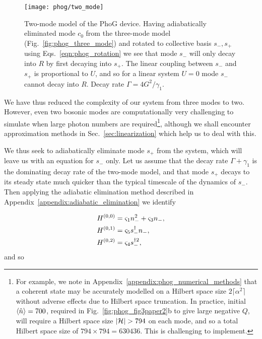 \begin{figure}[htp]
\captionsetup{width=0.8\linewidth}
\centering
\texttt{[image: phog/two\_mode]}
\caption{\label{fig:phog_two_mode_model} Two-mode model of the PhoG device. Having adiabatically eliminated mode $c_0$ from the three-mode model (Fig.~\ref{fig:phog_three_mode}) and rotated to collective basis $s_-, s_+$ using Eqs.~\ref{eqn:phog_rotation} we see that mode $s_-$ will only decay into $R$ by first decaying into $s_+$. The linear coupling between $s_-$ and $s_+$ is proportional to $U$, and so for a linear system $U=0$ mode $s_-$ cannot decay into $R$. Decay rate $\Gamma = 4 G^2 / \gamma_1$.}
\end{figure}


We have thus reduced the complexity of our system from three modes to two. However, even two bosonic modes are computationally very challenging to simulate when large photon numbers are required\footnote{For example, we note in Appendix~\ref{appendix:phog_numerical_methods} that a coherent state may be accurately modelled on a Hilbert space size $2 \lceil \alpha^2 \rceil$ without adverse effects due to Hilbert space truncation. In practice, initial $\ev{\hat{n}} = 700$, required in Fig.~\ref{fig:phog_fig3paper2}b to give large negative $Q$, will require a Hilbert space size $\left|\mathcal{H}\right| > 794$ on each mode, and so a total Hilbert space size of $794 \times 794 = 630436$. This is challenging to implement.}, although we shall encounter approximation methods in Sec.~\ref{sec:linearization} which help us to deal with this. 

We thus seek to adiabatically eliminate mode $s_+$ from the system, which will leave us with an equation for $s_-$ only. Let us assume that the decay rate $\Gamma + \gamma_1$ is the dominating decay rate of the two-mode model, and that mode $s_+$ decays to its steady state much quicker than the typical timescale of the dynamics of $s_-$. Then applying the adiabatic elimination method described in Appendix~\ref{appendix:adiabatic_elimination} we identify

\begin{align}\label{eqn:phog_single_mode_deriv_adiabatic}
H^{\left(0, 0\right)} &= \varsigma_1 n_-^2 + \varsigma_3 n_-, \notag \\ 
%
H^{\left(0, 1\right)} &= \varsigma_5 s_-^\dagger n_-, \notag \\
%
H^{\left(0, 2\right)} &= \varsigma_4 s_-^{\dagger 2},
\end{align}
and so


